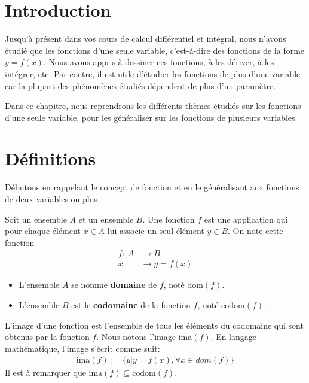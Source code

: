 \documentclass[]{book}
\providecommand{\tightlist}{%
  \setlength{\itemsep}{0pt}\setlength{\parskip}{0pt}}
\theoremstyle{definition}
\theoremstyle{definition}
\theoremstyle{definition}
\theoremstyle{remark}
\let\BeginKnitrBlock\begin \let\EndKnitrBlock\end
\begin{document}
\hypertarget{introduction-3}{%
\section{Introduction}\label{introduction-3}}

Jusqu'à présent dans vos cours de calcul différentiel et intégral, nous
n'avons étudié que les fonctions d'une seule variable, c'est-à-dire des
fonctions de la forme \(y=f(x)\). Nous avons appris à dessiner ces
fonctions, à les dériver, à les intégrer, etc. Par contre, il est utile
d'étudier les fonctions de plus d'une variable car la plupart des
phénomènes étudiés dépendent de plus d'un paramètre.

Dans ce chapitre, nous reprendrons les différents thèmes étudiés sur les
fonctions d'une seule variable, pour les généraliser sur les fonctions
de plusieurs variables.

\hypertarget{definitions}{%
\section{Définitions}\label{definitions}}

Débutons en rappelant le concept de fonction et en le généralisant aux
fonctions de deux variables ou plus.

\BeginKnitrBlock{definition}[Fonction]
\protect\hypertarget{def:unnamed-chunk-119}{}{\label{def:unnamed-chunk-119}
{} }Soit un ensemble \(A\) et un ensemble \(B\).
Une fonction \(f\) est une application qui pour chaque élément
\(x\in A\) lui associe un seul élément \(y\in B\). On note cette
fonction \begin{align*}
f:\ A&\longrightarrow  B\\
x&\longrightarrow  y=f(x)
\end{align*}

\begin{itemize}
\tightlist
\item
  L'ensemble \(A\) se nomme \textbf{domaine} de \(f\), noté
  \(\text{dom}(f)\).
\item
  L'ensemble \(B\) est le \textbf{codomaine} de la fonction \(f\), noté
  \(\text{codom}(f)\).
\end{itemize}
\EndKnitrBlock{definition}

\BeginKnitrBlock{definition}[Image d'une fonction]
\protect\hypertarget{def:unnamed-chunk-120}{}{\label{def:unnamed-chunk-120}
{} }L'image d'une fonction est
l'ensemble de tous les éléments du codomaine qui sont obtenus par la
fonction \(f\). Nous notons l'image \(\text{ima}(f)\). En langage
mathématique, l'image s'écrit comme suit: \begin{align*}
\text{ima}(f):=\{y|y=f(x),\forall x\in dom(f)\}
\end{align*} Il est à remarquer que
\(\text{ima}(f)\subseteq \text{codom}(f)\).
\EndKnitrBlock{definition}
\end{document}
